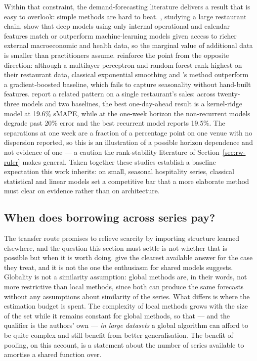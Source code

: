 Within that constraint, the demand-forecasting literature delivers a result
that is easy to overlook: simple methods are hard to beat.
\citet{chae_value_2024}, studying a large restaurant chain, show that deep
models using only internal operational and calendar features match or
outperform machine-learning models given access to richer external
macroeconomic and health data, so the marginal value of additional data is
smaller than practitioners assume. \citet{hossain_comparative_2025}
reinforce the point from the opposite direction: although a multilayer
perceptron and random forest rank highest on their restaurant data, classical
exponential smoothing and \citet{croston_forecasting_1972}'s method outperform
a gradient-boosted baseline, which fails to capture seasonality without
hand-built features. \citet{schmidt_machine_2022} report a related pattern on a
single restaurant's sales: across twenty-three models and two baselines, the
best one-day-ahead result is a kernel-ridge model at 19.6\% sMAPE, while at the
one-week horizon the non-recurrent models degrade past 20\% error and the best
recurrent model reports 19.5\%. The separations at one week are a fraction of a
percentage point on one venue with no dispersion reported, so this is an
illustration of a possible horizon dependence and not evidence of one --- a
caution the rank-stability literature of Section~\ref{sec:rw-ruler} makes
general. Taken together these studies establish a baseline expectation this
work inherits: on small, seasonal hospitality series, classical statistical and
linear models set a competitive bar that a more elaborate method must clear on
evidence rather than on architecture.

\subsection*{When does borrowing across series pay?}

The transfer route promises to relieve scarcity by importing structure learned
elsewhere, and the question this section must settle is not whether that is
possible but when it is worth doing.
\citet{montero-manso_principles_2021} give the clearest available answer for
the case they treat, and it is not the one the enthusiasm for shared models
suggests. Globality is not a similarity assumption: global methods are, in
their words, not more restrictive than local methods, since both can produce
the same forecasts without any assumptions about similarity of the series.
What differs is where the estimation budget is spent. The complexity of local
methods grows with the size of the set while it remains constant for global
methods, so that --- and the qualifier is the authors' own --- \emph{in large
datasets} a global algorithm can afford to be quite complex and still benefit
from better generalisation. The benefit of pooling, on this account, is a
statement about the number of series available to amortise a shared function
over.

